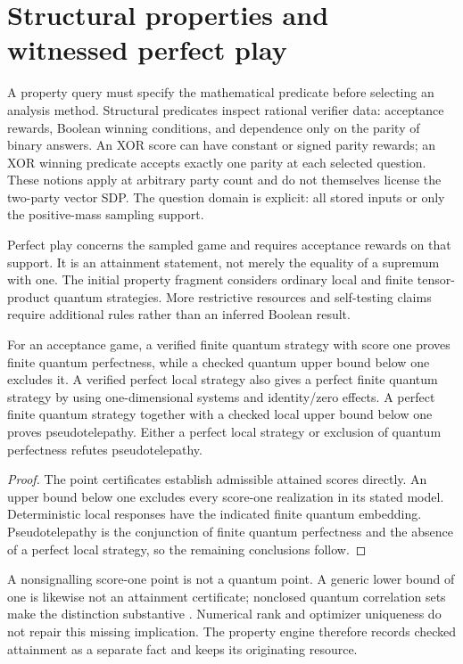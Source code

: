 \section{Structural properties and witnessed perfect play}
\label{sec:properties}

A property query must specify the mathematical predicate before selecting an
analysis method. Structural predicates inspect rational verifier data: acceptance
rewards, Boolean winning conditions, and dependence only on the parity of binary
answers. An XOR score can have constant or signed parity rewards; an XOR winning
predicate accepts exactly one parity at each selected question. These notions
apply at arbitrary party count and do not themselves license the two-party vector
SDP. The question domain is explicit: all stored inputs or only the positive-mass
sampling support.

Perfect play concerns the sampled game and requires acceptance rewards on that
support. It is an attainment statement, not merely the equality of a supremum
with one. The initial property fragment considers ordinary local and finite
tensor-product quantum strategies. More restrictive resources and self-testing
claims require additional rules rather than an inferred Boolean result.

\begin{proposition}
For an acceptance game, a verified finite quantum strategy with score one proves
finite quantum perfectness, while a checked quantum upper bound below one
excludes it. A verified perfect local strategy also gives a perfect finite quantum
strategy by using one-dimensional systems and identity/zero effects. A perfect
finite quantum strategy together with a checked local upper bound below one proves
pseudotelepathy. Either a perfect local strategy or exclusion of quantum perfectness
refutes pseudotelepathy.
\end{proposition}
\begin{proof}
The point certificates establish admissible attained scores directly. An upper
bound below one excludes every score-one realization in its stated model.
Deterministic local responses have the indicated finite quantum embedding.
Pseudotelepathy is the conjunction of finite quantum perfectness and the absence
of a perfect local strategy, so the remaining conclusions follow.
\end{proof}
A nonsignalling score-one point is not a quantum point. A generic lower bound of
one is likewise not an attainment certificate; nonclosed quantum correlation sets
make the distinction substantive \cite{slofstra2019}. Numerical rank and optimizer
uniqueness do not repair this missing implication. The property engine therefore
records checked attainment as a separate fact and keeps its originating resource.

